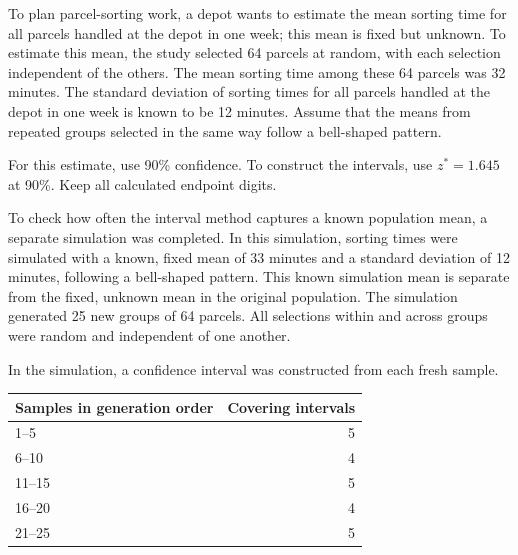 To plan parcel-sorting work, a depot wants to estimate the mean sorting time for all parcels handled at the depot in one week; this mean is fixed but unknown. To estimate this mean, the study selected 64 parcels at random, with each selection independent of the others. The mean sorting time among these 64 parcels was 32 minutes. The standard deviation of sorting times for all parcels handled at the depot in one week is known to be 12 minutes. Assume that the means from repeated groups selected in the same way follow a bell-shaped pattern.

For this estimate, use 90\% confidence. To construct the intervals, use $z^*=1.645$ at 90\%. Keep all calculated endpoint digits.

To check how often the interval method captures a known population mean, a separate simulation was completed. In this simulation, sorting times were simulated with a known, fixed mean of 33 minutes and a standard deviation of 12 minutes, following a bell-shaped pattern. This known simulation mean is separate from the fixed, unknown mean in the original population. The simulation generated 25 new groups of 64 parcels. All selections within and across groups were random and independent of one another.

In the simulation, a confidence interval was constructed from each fresh sample.
\begin{center}\begin{tabular}{@{}lr@{}}\toprule
Samples in generation order & Covering intervals\\\midrule
1--5 & 5 \\[6pt]
6--10 & 4 \\[6pt]
11--15 & 5 \\[6pt]
16--20 & 4 \\[6pt]
21--25 & 5 \\[6pt]
\bottomrule\end{tabular}\end{center}

